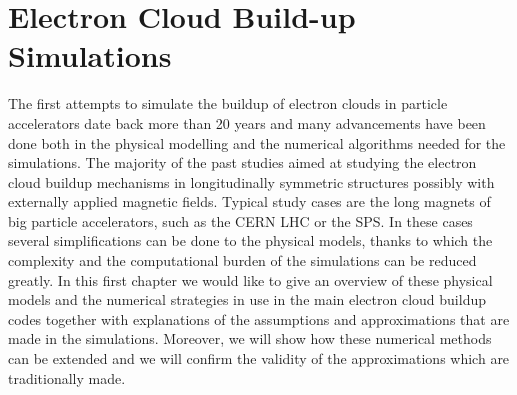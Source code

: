 \chapter{Electron Cloud Build-up
Simulations}
\label{ch:1}

The first attempts to simulate the buildup of electron clouds in particle accelerators date back more than 20 years and many advancements have been done both in the physical modelling and the numerical algorithms needed for the simulations.
The majority of the past studies aimed at studying the electron cloud buildup mechanisms in longitudinally symmetric structures possibly with externally applied magnetic fields. Typical study cases are the long magnets of big particle accelerators, such as the CERN LHC or the SPS. In these cases several simplifications can be done to the physical models, thanks to which the complexity and the computational burden of the simulations can be reduced greatly. 
In this first chapter we would like to give an overview of these physical models and the numerical strategies in use in the main electron cloud buildup codes together with explanations of the assumptions and approximations that are made in the simulations. Moreover, we will show how these numerical methods can be extended and we will confirm the validity of the approximations which are traditionally made.

